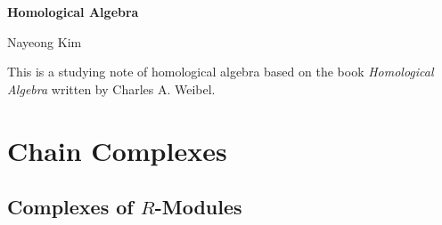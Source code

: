 \documentclass{article} %
\newcommand{\maketitletwo}{\begin{center}
        \Large{\textbf{Homological Algebra}} %
        \vspace{10pt}
        
        \normalsize{\hfill Nayeong Kim  %
        }        %
	\vspace{10pt}
\end{center}}
\begin{document}
\maketitletwo
This is a studying note of homological algebra based on the book \textit{Homological Algebra} written by Charles A. Weibel.

\section{Chain Complexes}
\subsection{Complexes of $R$-Modules}
\end{document}
